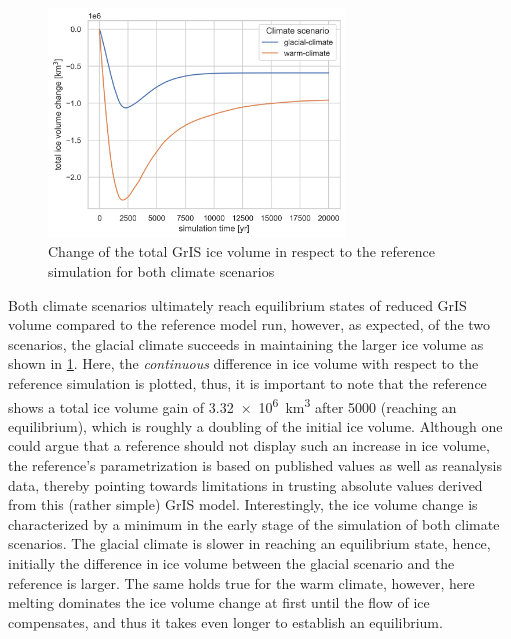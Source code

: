 \begin{figure}
	\centering
	\includegraphics[width=0.7\textwidth]{../climate-anomalies/figs/ice-volume-change.png}
	\caption{Change of the total GrIS ice volume in respect to the reference simulation for both climate scenarios}
	\label{fig:scenarios-icevol-change}
\end{figure}

Both climate scenarios ultimately reach equilibrium states of reduced GrIS volume compared to the reference model run, however, as expected, of the two scenarios, the glacial climate succeeds in maintaining the larger ice volume as shown in \cref{fig:scenarios-icevol-change}. Here, the \textit{continuous} difference in ice volume with respect to the reference simulation is plotted, thus, it is important to note that the reference shows a total ice volume gain of \SI{3.32e6}{\km^3} after \SI{5000}{\year} (reaching an equilibrium), which is roughly a doubling of the initial ice volume.
Although one could argue that a reference should not display such an increase in ice volume, the reference's parametrization is based on published values as well as reanalysis data, thereby pointing towards limitations in trusting absolute values derived from this (rather simple) GrIS model. Interestingly, the ice volume change is characterized by a minimum in the early stage of the simulation of both climate scenarios. The glacial climate is slower in reaching an equilibrium state, hence, initially the difference in ice volume between the glacial scenario and the reference is larger. The same holds true for the warm climate, however, here melting dominates the ice volume change at first until the flow of ice compensates, and thus it takes even longer to establish an equilibrium.


